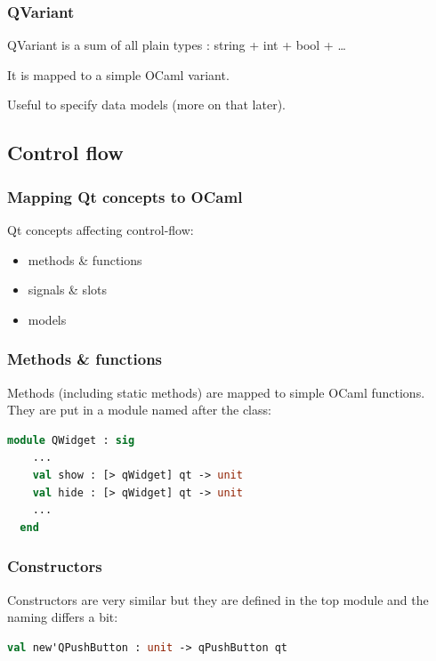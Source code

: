 \documentclass[serif,mathserif]{beamer}
\begin{document}
\begin{frame}
  \frametitle{QVariant}

  QVariant is a sum of all plain types : string + int + bool + \ldots

  It is mapped to a simple OCaml variant.

  Useful to specify data models (more on that later).
\end{frame}

\subsection{Control flow}

\begin{frame}
  \frametitle{Mapping Qt concepts to OCaml}

  Qt concepts affecting control-flow:
  \begin{itemize}
    \item methods \& functions
    \item signals \& slots
    \item models
  \end{itemize}
\end{frame}

\begin{frame}[fragile]
  \frametitle{Methods \& functions}

  Methods (including static methods) are mapped to simple OCaml functions.
  They are put in a module named after the class:

  \begin{lstlisting}[language=Caml,morekeywords={module,sig,end,val}]
  module QWidget : sig
    ...
    val show : [> qWidget] qt -> unit
    val hide : [> qWidget] qt -> unit
    ...
  end 
  \end{lstlisting}

\end{frame}

\begin{frame}[fragile]
  \frametitle{Constructors}

  Constructors are very similar but they are defined in the top module and the
  naming differs a bit: 

  \begin{lstlisting}[language=Caml,morekeywords={module,sig,end}]
  val new'QPushButton : unit -> qPushButton qt
  \end{lstlisting}

\end{frame}
\end{document}

